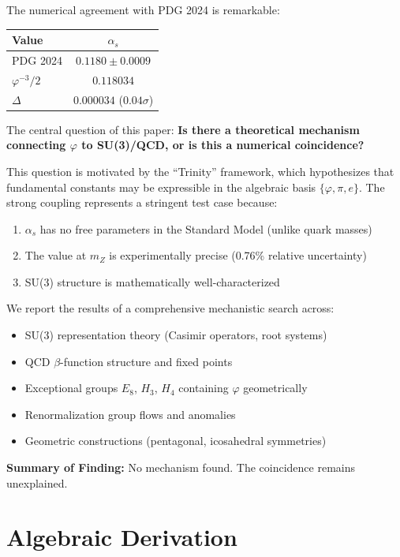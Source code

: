 \documentclass{article}
\begin{document}
The numerical agreement with PDG 2024 is remarkable:

\begin{table}[h]
\centering
\begin{tabular}{lc}
\toprule
Value & $\alpha_s$ \\
\midrule
PDG 2024 & $0.1180 \pm 0.0009$ \\
$\varphi^{-3}/2$ & $0.118034$ \\
$\Delta$ & $0.000034$ ($0.04\sigma$) \\
\bottomrule
\end{tabular}
\end{table}

The central question of this paper: \textbf{Is there a theoretical mechanism connecting $\varphi$ to SU(3)/QCD, or is this a numerical coincidence?}

This question is motivated by the ``Trinity'' framework, which hypothesizes that fundamental constants may be expressible in the algebraic basis $\{\varphi, \pi, e\}$. The strong coupling represents a stringent test case because:

\begin{enumerate}
\item $\alpha_s$ has no free parameters in the Standard Model (unlike quark masses)
\item The value at $m_Z$ is experimentally precise (0.76\% relative uncertainty)
\item SU(3) structure is mathematically well-characterized
\end{enumerate}

We report the results of a comprehensive mechanistic search across:
\begin{itemize}
\item SU(3) representation theory (Casimir operators, root systems)
\item QCD $\beta$-function structure and fixed points
\item Exceptional groups $E_8$, $H_3$, $H_4$ containing $\varphi$ geometrically
\item Renormalization group flows and anomalies
\item Geometric constructions (pentagonal, icosahedral symmetries)
\end{itemize}

\textbf{Summary of Finding:} No mechanism found. The coincidence remains unexplained.

\section{Algebraic Derivation}
\end{document}
